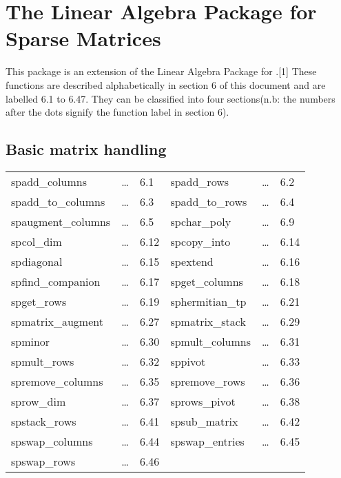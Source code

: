 \section{The Linear Algebra Package for Sparse Matrices}
This package is an extension of the Linear Algebra Package for \REDUCE{}.[1]
These functions are described 
alphabetically in section 6 of this document and are labelled 6.1 to 
6.47. They can be classified into four sections(n.b: the numbers after 
the dots signify the function label in section 6).
\subsection{Basic matrix handling}
\begin{center}
\begin{tabular}{l l l l l l}
spadd\_columns     & \ldots & 6.1  & 
spadd\_rows        & \ldots & 6.2  \\
spadd\_to\_columns & \ldots & 6.3  &
spadd\_to\_rows    & \ldots & 6.4  \\
spaugment\_columns & \ldots & 6.5  &
spchar\_poly       & \ldots & 6.9  \\
spcol\_dim      & \ldots & 6.12  &
spcopy\_into       & \ldots & 6.14 \\
spdiagonal         & \ldots & 6.15 &
spextend           & \ldots & 6.16 \\
spfind\_companion  & \ldots & 6.17  &
spget\_columns     & \ldots & 6.18 \\
spget\_rows        & \ldots & 6.19 &
sphermitian\_tp    & \ldots & 6.21 \\
spmatrix\_augment  & \ldots & 6.27 &
spmatrix\_stack    & \ldots & 6.29 \\
spminor            & \ldots & 6.30 &
spmult\_columns    & \ldots & 6.31 \\ 
spmult\_rows       & \ldots & 6.32 &
sppivot            & \ldots & 6.33 \\
spremove\_columns  & \ldots & 6.35 &
spremove\_rows     & \ldots & 6.36 \\
sprow\_dim         & \ldots & 6.37 &
sprows\_pivot      & \ldots & 6.38 \\
spstack\_rows      & \ldots & 6.41 &
spsub\_matrix      & \ldots & 6.42 \\
spswap\_columns    & \ldots & 6.44 &
spswap\_entries    & \ldots & 6.45 \\
spswap\_rows       & \ldots & 6.46 &
\end{tabular}
\end{center}

